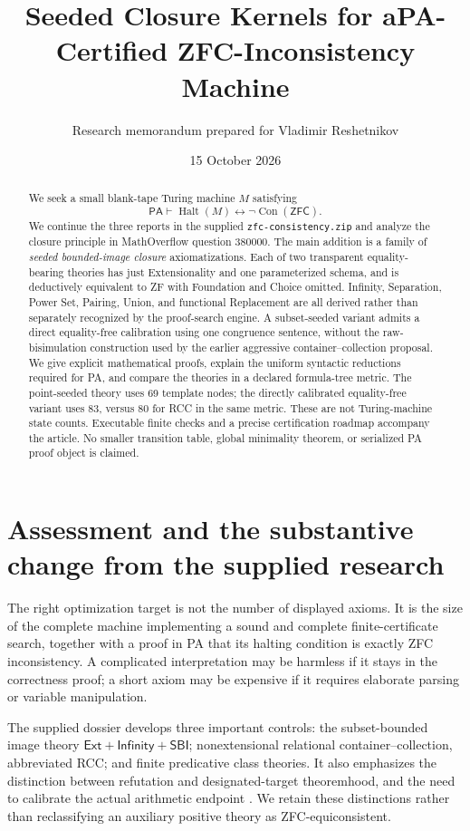 \documentclass[11pt,letterpaper]{article}
\title{\textbf{Seeded Closure Kernels for a\newline PA-Certified ZFC-Inconsistency Machine}}
\author{Research memorandum prepared for Vladimir Reshetnikov}
\date{15 October 2026}
\theoremstyle{definition}\newtheorem{definition}[theorem]{Definition}
\theoremstyle{remark}\newtheorem{remark}[theorem]{Remark}
\newcommand{\PA}{\mathsf{PA}}
\newcommand{\ZFC}{\mathsf{ZFC}}
\newcommand{\Ext}{\mathsf{Ext}}
\newcommand{\Con}{\operatorname{Con}}
\newcommand{\Halt}{\operatorname{Halt}}
\newcommand{\SBI}{\mathsf{SBI}}
\begin{document}
\maketitle
\begin{abstract}
We seek a small blank-tape Turing machine $M$ satisfying
\[\PA\vdash\Halt(M)\leftrightarrow\neg\Con(\ZFC).\]
We continue the three reports in the supplied \texttt{zfc-consistency.zip}
and analyze the closure principle in MathOverflow question 380000.
The main addition is a family of \emph{seeded bounded-image closure}
axiomatizations. Each of two transparent equality-bearing theories has
just Extensionality and one parameterized schema, and is deductively
equivalent to ZF with Foundation and Choice omitted. Infinity,
Separation, Power Set, Pairing, Union, and functional Replacement are
all derived rather than separately recognized by the proof-search engine.
A subset-seeded variant admits a direct equality-free calibration using
one congruence sentence, without the raw-bisimulation construction used
by the earlier aggressive container--collection proposal.
We give explicit mathematical proofs, explain the uniform syntactic
reductions required for PA, and compare the theories in a declared
formula-tree metric. The point-seeded theory uses 69 template nodes;
the directly calibrated equality-free variant uses 83, versus 80 for
RCC in the same metric. These are not Turing-machine state counts.
Executable finite checks and a precise certification roadmap accompany
the article. No smaller transition table, global minimality theorem,
or serialized PA proof object is claimed.
\end{abstract}
\tableofcontents
\clearpage

\section{Assessment and the substantive change from the supplied research}

The right optimization target is not the number of displayed axioms.
It is the size of the complete machine implementing a sound and complete
finite-certificate search, together with a proof in PA that its halting
condition is exactly ZFC inconsistency. A complicated interpretation may
be harmless if it stays in the correctness proof; a short axiom may be
expensive if it requires elaborate parsing or variable manipulation.

The supplied dossier develops three important controls: the
subset-bounded image theory $\Ext+\mathsf{Infinity}+\SBI$;
nonextensional relational container--collection, abbreviated RCC; and
finite predicative class theories. It also emphasizes the distinction
between refutation and designated-target theoremhood, and the need to
calibrate the actual arithmetic endpoint \cite{prior1,prior2,prior3}.
We retain these distinctions rather than reclassifying an auxiliary
positive theory as ZFC-equiconsistent.
\end{document}
